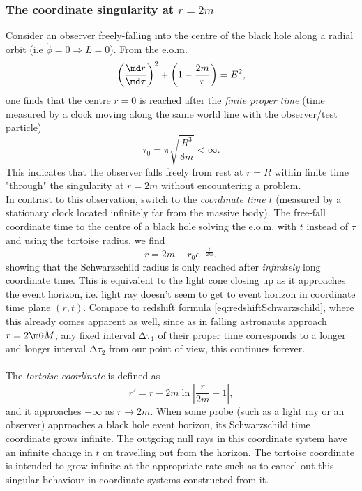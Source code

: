 \subsubsection{The coordinate singularity at $r=2m$}
Consider an observer freely-falling into the centre of the black hole along a radial orbit (i.e $\dot{\phi} =0 \Rightarrow L=0$). From the e.o.m.
\begin{equation}
	\left(\frac{\md r}{\md \tau}\right)^2 + \left(1-\frac{2m}{r}\right) = E^2,
\end{equation}
one finds that the centre $r=0$ is reached after the \emph{finite proper time} (time measured by a clock moving along the same world line with the observer/test particle)
\begin{equation}
	\tau_0 = \pi \sqrt{\frac{R^3}{8 m} }< \infty.
\end{equation}
This indicates that the observer falls freely from rest at $r=R$ within finite time "through" the singularity at $r=2m$ without encountering a problem.\\
In contrast to this observation, switch to the \emph{coordinate time} $t$ (measured by a stationary clock located infinitely far from the massive body).
The free-fall coordinate time to the centre of a black hole solving the e.o.m. with $t$ instead of $\tau$ and using the tortoise radius, we find
\begin{equation}
	r = 2m+r_0 e^{-\frac{t}{2m}},
\end{equation}
showing that the Schwarzschild radius is only reached after \emph{infinitely} long coordinate time. This is equivalent to the light cone closing up as it approaches the event horizon, i.e. light ray doesn't seem to get to event horizon in coordinate time plane $(r,t)$. Compare to redshift formula \ref{eq:redshiftSchwarzschild}, where this already comes apparent as well, since as in falling astronauts approach $r = 2\mG M$, any
fixed interval $∆τ_1$ of their proper time corresponds to a longer and longer interval $∆τ_2$ from
our point of view, this continues forever. \\
\\
The \emph{tortoise coordinate} is defined as 
\begin{equation}
	r'= r- 2 m \ln{\left|\frac{r}{2m} -1\right|},
\end{equation}
and it approaches $-\infty$  as $r\rightarrow 2m$. When some probe (such as a light ray or an observer) approaches a black hole event horizon, its Schwarzschild time coordinate grows infinite. The outgoing null rays in this coordinate system have an infinite change in $t$ on travelling out from the horizon. The tortoise coordinate is intended to grow infinite at the appropriate rate such as to cancel out this singular behaviour in coordinate systems constructed from it.\\ \\
